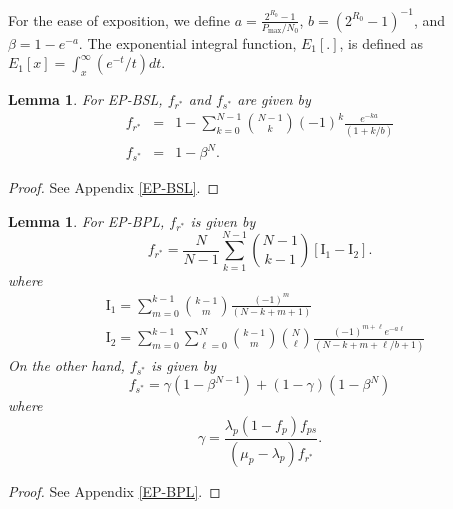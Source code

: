 \documentclass[journal,twocolumn]{IEEEtran}
\newtheorem{lemma}[theorem]{Lemma}
\begin{document}
For the ease of exposition, we define $a=\frac{2^{R_{0}}-1}{P_{\mathrm{max}}/N_{0}}$, $b=(2^{R_{0}}-1)^{-1}$, and $\beta=1-e^{-a}$. The exponential integral function, $E_{1}[.]$, is defined as $E_{1} [x]=\int_{x}^{\infty}(e^{-t}/t)dt$.
\begin{lemma}\label{lemma2}
For EP-BSL, $f_{r^*}$ and $f_{s^*}$ are given by
\begin{eqnarray}
f_{r^*}&=& 1- \displaystyle \sum_{k=0}^{N-1} {N-1 \choose k} (-1)^{k}
\frac{e^{-ka}}{(1+k/b)} \label{fkpDpBSL} \\
f_{s^*}&=&1-\beta^N. \label{fksDsBSL}
\end{eqnarray}
\end{lemma}
\begin{proof}
See Appendix \ref{EP-BSL}.
\end{proof}

\begin{lemma}\label{lemma3}
For EP-BPL, $f_{r^*}$ is given by
\begin{equation}
f_{r^*}=\frac{N}{N-1} \displaystyle \sum_{k=1}^{N-1} {N-1 \choose k-1} 
\left[ \mathrm{I}_{1} - \mathrm{I}_{2} \right]. \label{fskpDp_FPBPL}
\end{equation} 
where
\begin{align}
&\mathrm{I}_{1}=\displaystyle \sum_{m=0}^{k-1} {k-1 \choose m} \frac{(-1)^{m}}{(N-k+m+1)} \\
&\mathrm{I}_{2}=\displaystyle \sum_{m=0}^{k-1} \sum_{\ell=0}^{N} {k-1 \choose m} {N \choose \ell}
\frac{(-1)^{m+\ell}e^{-a \ell}}{(N-k+m+\ell / b +1)} 
\end{align}
On the other hand, $f_{s^*}$ is given by
\begin{equation}
f_{s^*}=\gamma \left(1-\beta^{N-1}\right) + (1-\gamma)\left(1-\beta^N\right) \label{fksDs_UPBPL}
\end{equation}
where
\begin{equation}\label{gamma}
\gamma=\frac{\lambda_{p}(1-f_{p})f_{ps}}{(\mu_{p}-\lambda_{p})f_{r^*}}.
\end{equation}
\end{lemma}
\begin{proof}
See Appendix \ref{EP-BPL}.
\end{proof}
\end{document}
